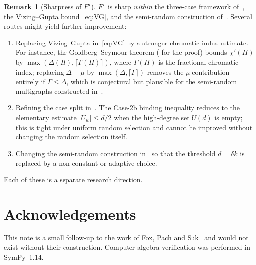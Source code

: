 \documentclass[11pt,a4paper]{article}
\theoremstyle{definition}
\newtheorem{remark}[theorem]{Remark}
\newcommand{\chip}{\chi'}
\begin{document}
\begin{remark}[Sharpness of $F^{\star}$]\label{rem:sharp}
$F^{\star}$ is sharp \emph{within} the three-case framework
of~\cite[Claim 3.7]{FPS}, the Vizing--Gupta bound~\eqref{eq:VG}, and
the semi-random construction of~\cite[\S 3]{FPS}. Several routes might
yield further improvement:
\begin{enumerate}
\item Replacing Vizing--Gupta in~\eqref{eq:VG} by a stronger
  chromatic-index estimate. For instance, the Goldberg--Seymour
  theorem (\cite{ChenJingZang} for the proof) bounds
  $\chip(H)$ by $\max(\Delta(H), \lceil\Gamma(H)\rceil)$, where
  $\Gamma(H)$ is the fractional chromatic index; replacing
  $\Delta+\mu$ by $\max(\Delta,\lceil\Gamma\rceil)$ removes the
  $\mu$ contribution entirely if $\Gamma\le\Delta$, which is conjectural
  but plausible for the semi-random multigraphs constructed in~\cite{FPS}.
\item Refining the case split in~\cite[Claim 3.7]{FPS}. The Case-2b
  binding inequality reduces to the elementary estimate
  $|U_w|\le d/2$ when the high-degree set $U(d)$ is empty; this is
  tight under uniform random selection and cannot be improved without
  changing the random selection itself.
\item Changing the semi-random construction in~\cite[\S 3]{FPS} so
  that the threshold $d=\delta k$ is replaced by a non-constant or
  adaptive choice.
\end{enumerate}
Each of these is a separate research direction.
\end{remark}

\section*{Acknowledgements}
This note is a small follow-up to the work of Fox, Pach and Suk~\cite{FPS}
and would not exist without their construction. Computer-algebra
verification was performed in SymPy~1.14.
\end{document}
